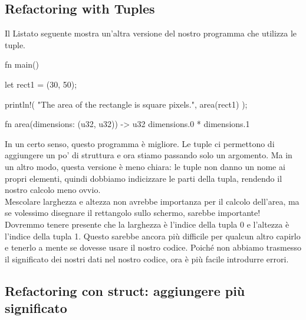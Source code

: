 \documentclass[11pt,a4paper]{article}
\begin{document}
\subsection{Refactoring with Tuples}
Il Listato seguente mostra un'altra versione del nostro programma che utilizza le tuple.
\begin{rust}
fn main() {
    let rect1 = (30, 50);

    println!(
        "The area of the rectangle is {} square pixels.",
        area(rect1)
    );
}

fn area(dimensions: (u32, u32)) -> u32 {
    dimensions.0 * dimensions.1
}
\end{rust}
In un certo senso, questo programma è migliore. Le tuple ci permettono di aggiungere un po' di struttura e ora stiamo passando solo un argomento. Ma in un altro modo, questa versione è meno chiara: le tuple non danno un nome ai propri elementi, quindi dobbiamo indicizzare le parti della tupla, rendendo il nostro calcolo meno ovvio.\\
Mescolare larghezza e altezza non avrebbe importanza per il calcolo dell'area, ma se volessimo disegnare il rettangolo sullo schermo, sarebbe importante! Dovremmo tenere presente che la larghezza è l'indice della tupla 0 e l'altezza è l'indice della tupla 1. Questo sarebbe ancora più difficile per qualcun altro capirlo e tenerlo a mente se dovesse usare il nostro codice. Poiché non abbiamo trasmesso il significato dei nostri dati nel nostro codice, ora è più facile introdurre errori.\\
\subsection{Refactoring con struct: aggiungere più significato}
\end{document}
